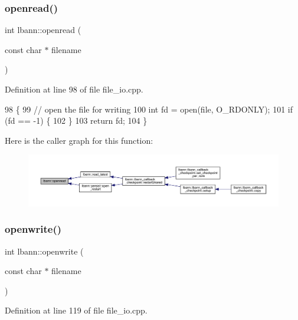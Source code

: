 \subsubsection{\texorpdfstring{openread()}{openread()}}
{\footnotesize\ttfamily int lbann\+::openread (\begin{DoxyParamCaption}\item[{const char $\ast$}]{filename }\end{DoxyParamCaption})}



Definition at line 98 of file file\+\_\+io.\+cpp.


\begin{DoxyCode}
98                                     \{
99   \textcolor{comment}{// open the file for writing}
100   \textcolor{keywordtype}{int} fd = open(file, O\_RDONLY);
101   \textcolor{keywordflow}{if} (fd == -1) \{
102   \}
103   \textcolor{keywordflow}{return} fd;
104 \}
\end{DoxyCode}
Here is the caller graph for this function\+:\nopagebreak
\begin{figure}[H]
\begin{center}
\leavevmode
\includegraphics[width=350pt]{namespacelbann_a6084b9319eea1997f8446fa3e6879532_icgraph}
\end{center}
\end{figure}
\mbox{\label{namespacelbann_af596e6d2be603e9cf808c98f5412490a}} 
\subsubsection{\texorpdfstring{openwrite()}{openwrite()}}
{\footnotesize\ttfamily int lbann\+::openwrite (\begin{DoxyParamCaption}\item[{const char $\ast$}]{filename }\end{DoxyParamCaption})}



Definition at line 119 of file file\+\_\+io.\+cpp.


